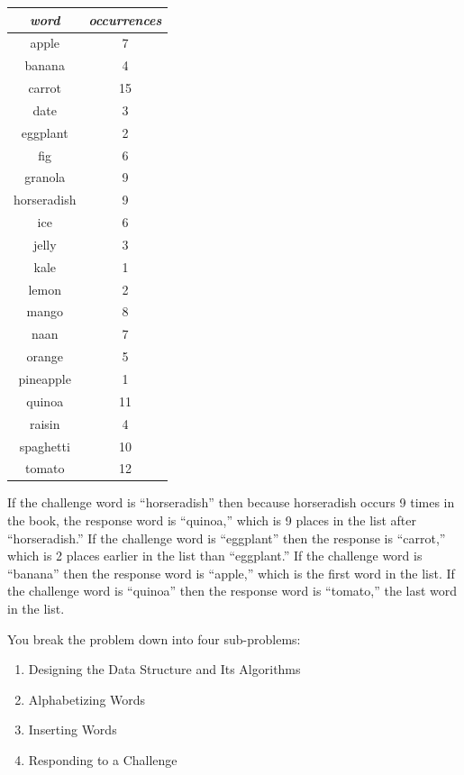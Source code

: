 \begin{center}
    \begin{tabular}{cc}
        \textit{word} & \textit{occurrences} \\ \hline
        apple       & 7 \\
        banana      & 4 \\
        carrot      & 15 \\
        date        & 3 \\
        eggplant    & 2 \\
        fig         & 6 \\
        granola     & 9 \\
        horseradish & 9 \\
        ice         & 6 \\
        jelly       & 3 \\
        kale        & 1 \\
        lemon       & 2 \\
        mango       & 8 \\
        naan        & 7 \\
        orange      & 5 \\
        pineapple   & 1 \\
        quinoa      & 11 \\
        raisin      & 4 \\
        spaghetti   & 10 \\
        tomato      & 12 \\
    \end{tabular}
\end{center}
If the challenge word is ``horseradish'' then because horseradish occurs 9 times in the book, the response word is ``quinoa,'' which is 9 places in the list after ``horseradish.''
If the challenge word is ``eggplant'' then the response is ``carrot,'' which is 2 places earlier in the list than ``eggplant.''
If the challenge word is ``banana'' then the response word is ``apple,'' which is the first word in the list.
If the challenge word is ``quinoa'' then the response word is ``tomato,'' the last word in the list.

You break the problem down into four sub-problems:

\begin{enumerate}
    \item Designing the Data Structure and Its Algorithms
    \item Alphabetizing Words
    \item Inserting Words
    \item Responding to a Challenge
\end{enumerate}

